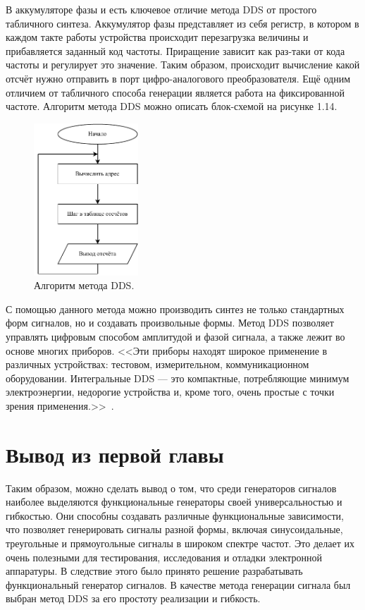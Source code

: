 	В аккумуляторе фазы и есть ключевое отличие метода DDS от простого табличного синтеза. Аккумулятор фазы представляет из себя регистр, в котором в каждом такте работы устройства происходит перезагрузка величины и прибавляется заданный код частоты. Приращение зависит как раз-таки от кода частоты и регулирует это значение. Таким образом, происходит вычисление какой отсчёт нужно отправить в порт цифро-аналогового преобразователя. Ещё одним отличием от табличного способа генерации является работа на фиксированной частоте. Алгоритм метода DDS можно описать блок-схемой на рисунке 1.14.
	
	\begin{figure}[H]
    \centering
    \includegraphics[width=0.35\textwidth]{../image/dds_block.pdf}
    \caption{Алгоритм метода DDS.}
	\end{figure}
	
	С помощью данного метода можно производить синтез не только стандартных форм сигналов, но и создавать произвольные формы. Метод DDS позволяет управлять цифровым способом амплитудой и фазой сигнала, а также лежит во основе многих приборов. <<Эти приборы находят широкое применение в различных устройствах: тестовом, измерительном, коммуникационном оборудовании. Интегральные DDS --- это компактные, потребляющие минимум электроэнергии, недорогие устройства и, кроме того, очень простые с точки зрения применения.>>~\cite{dds}. 
	
\section{Вывод из первой главы}
	Таким образом, можно сделать вывод о том, что среди генераторов сигналов наиболее  выделяются функциональные генераторы своей универсальностью и гибкостью. Они способны создавать различные функциональные зависимости, что позволяет генерировать сигналы разной формы, включая синусоидальные, треугольные и прямоугольные сигналы в широком спектре частот. Это делает их очень полезными для тестирования, исследования и отладки электронной аппаратуры. В следствие этого было принято решение разрабатывать функциональный генератор сигналов. В качестве метода генерации сигнала был выбран метод DDS за его простоту реализации и гибкость.
	
	